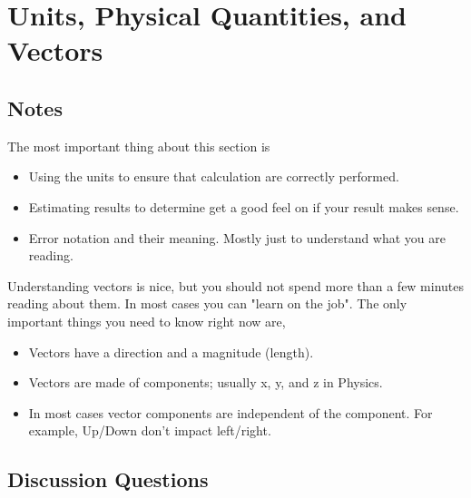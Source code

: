 
\chapter{Units, Physical Quantities, and Vectors}

\section{Notes}

The most important thing about this section is 
\begin{itemize}
	\item{Using the units to ensure that calculation are correctly performed.}
	\item{Estimating results to determine get a good feel on if your result makes sense.}
	\item{Error notation and their meaning. Mostly just to understand what you are reading.}
\end{itemize}

Understanding vectors is nice, but you should not spend more than a few minutes reading about them. In most cases you can "learn on the job". The only important things you need to know right now are,

\begin{itemize}
	\item{Vectors have a direction and a magnitude (length).}
	\item{Vectors are made of components; usually x, y, and z in Physics.}
	\item{In most cases vector components are independent of the component. For example, Up/Down don't impact left/right.}
\end{itemize}

\section{Discussion Questions}



